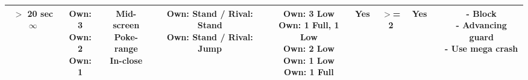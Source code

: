\documentclass{article}
\begin{document}
\begin{landscape}
\begin{table}[h!]
\begin{center}
\begin{tabular*}{27cm}{c|c|c|c|c|c|c|c|c|c}
      \hline
      \makecell{$>$ 20 sec \\ $\infty$} & \makecell{Own: 3 \\ Own: 2 \\ Own: 1} & \makecell{Mid-screen \\ Poke-range \\ In-close} & \makecell{Own: Stand / Rival: Stand \\ Own: Stand / Rival: Jump} & \makecell{Own: 3 Low \\ Own: 1 Full, 1 Low \\ Own: 2 Low \\ Own: 1 Low \\ Own: 1 Full} & Yes & $>$= 2 & Yes & & \makecell{- Block \\ - Advancing guard \\ - Use mega crash}\\
      \hline
    \end{tabular*}
  \end{center}
\end{table}

\end{landscape}

\newpage 
\end{document}
